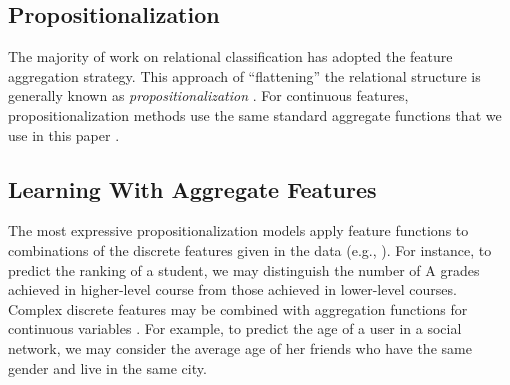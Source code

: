 \documentclass[conference]{IEEEtran}
\begin{document}
\subsection{Propositionalization} The majority of work on relational classification has adopted the feature aggregation strategy.
This approach of ``flattening'' the relational structure is generally known as {\em propositionalization} \cite{Kramer2000}. %
%
For continuous features, propositionalization methods use the same standard aggregate functions that we use in this paper \cite{Krogel2002,C.Vens2004}.

\subsection{Learning With Aggregate Features} The most expressive propositionalization models apply feature functions to combinations of the discrete features given in the data (e.g., \cite{Kuzelka2011}). For instance, to predict the ranking of a student, we may distinguish the number of A grades achieved in higher-level course from those achieved in lower-level courses. Complex discrete features may be combined with aggregation functions for continuous variables  \cite{C.Vens2004,Popescul2007}. For example, to predict the age of a user in a social network, we may consider the average age of her friends who have the same gender and live in the same city.
\end{document}
